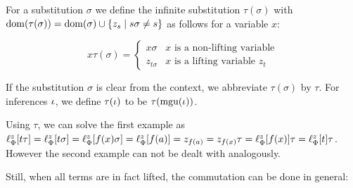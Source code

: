 \begin{defi}
	For a substitution $\sigma$ we define the infinite substitution $\tau(\sigma)$ with $\operatorname{dom}(\tau(\sigma)) = \operatorname{dom}(\sigma) \cup \{z_s \mid s\sigma \neq s\}$ as follows for a variable $x$:

	\[
		x\tau(\sigma) =
		\begin{cases}
			x\sigma & \text{$x$ is a non-lifting variable} \\
			z_{t\sigma} & \text{$x$ is a lifting variable $z_t$}
		\end{cases} 
	\]

	If the substitution $\sigma$ is clear from the context, we abbreviate $\tau(\sigma)$ by $\tau$. 
	For inferences $\iota$, we define $\tau(\iota)$ to be $\tau(\operatorname{mgu}(\iota))$.
\end{defi}

\addtocounter{exa}{-2}
\begin{exa}[continued]
	Using $\tau$, we can solve the first example as $\ell_{\Phi}^{z}[t\tau] = \ell_{\Phi}^{z}[t\sigma] = \ell_{\Phi}^{z}[f(x)\sigma] = \ell_{\Phi}^{z}[f(a)] = z_{f(a)} = z_{f(x)} \tau = \ell_{\Phi}^{z}[f(x)]\tau = \ell_{\Phi}^{z}[t]\tau$.
	However the second example can not be dealt with analogously.
\end{exa}
\addtocounter{exa}{1}

Still, when all terms are in fact lifted, the commutation can be done in general:


